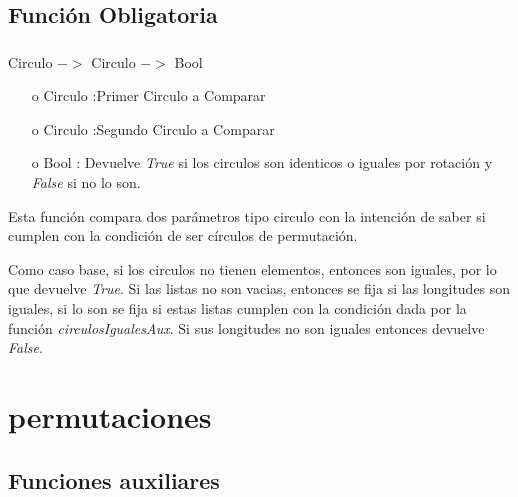 \documentclass[10pt,journal]{IEEEtran}
\begin{document}
\subsection{Función Obligatoria}
\subsubsection{\color{Red}{sonCirculosIguales}}
\begin{description}[style=nextline]
        \item[\color{Green}{Signatura}] Circulo $->$ Circulo $->$ Bool  
        \begin{itemize}
        \item [o]  Circulo :Primer Circulo a Comparar
        \item [o]  Circulo :Segundo Circulo a Comparar
        \item [o]  Bool : Devuelve \textit{True} si los circulos son identicos o iguales por rotación y \textit{False} si no lo son.
        \end{itemize}        
        
        \item[\color{Green}{Descripción}]  Esta función compara dos parámetros tipo circulo con la intención de saber si cumplen con la condición de ser círculos de permutación.
        
        Como caso base, si los circulos no tienen elementos, entonces son iguales, por lo que devuelve \textit{True}. Si las listas no son vacias, entonces se fija si las longitudes son iguales, si lo son se fija si estas listas cumplen con la condición dada por la función \textit{circulosIgualesAux}. Si sus longitudes no son iguales entonces devuelve \textit{False}.  
\end{description}

\section{permutaciones}
\subsection{Funciones auxiliares}
\end{document}
